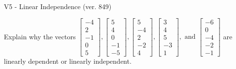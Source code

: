 \begin{exercise}
  \begin{exerciseTitle}V5 - Linear Independence (ver. 849)\end{exerciseTitle}
  \begin{exerciseStatement}
    Explain why the vectors \(\left[\begin{array}{r}
-4 \\
2 \\
-1 \\
0 \\
5
\end{array}\right] , \left[\begin{array}{r}
5 \\
4 \\
0 \\
-1 \\
-5
\end{array}\right] , \left[\begin{array}{r}
5 \\
-4 \\
2 \\
-2 \\
4
\end{array}\right] , \left[\begin{array}{r}
3 \\
4 \\
5 \\
-3 \\
1
\end{array}\right] , \text{ and } \left[\begin{array}{r}
-6 \\
0 \\
-4 \\
-2 \\
-1
\end{array}\right]\) are linearly dependent or linearly independent.	



\end{exerciseStatement}
\end{exercise}
